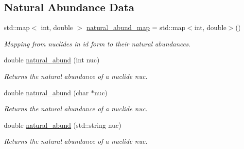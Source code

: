 \subsection*{Natural Abundance Data}
\begin{DoxyCompactItemize}
\item 
\mbox{\label{namespacepyne_aa4d7a8d3ef120d4d1abcfdf3f45b8964}} 
std\+::map$<$ int, double $>$ \hyperlink{namespacepyne_aa4d7a8d3ef120d4d1abcfdf3f45b8964}{natural\+\_\+abund\+\_\+map} = std\+::map$<$int, double$>$()
\begin{DoxyCompactList}\small\item\em Mapping from nuclides in id form to their natural abundances. \end{DoxyCompactList}\item 
double \hyperlink{namespacepyne_aa34a8311add97b0e90ce7600aa86f000}{natural\+\_\+abund} (int nuc)
\begin{DoxyCompactList}\small\item\em Returns the natural abundance of a nuclide {\itshape nuc}. \end{DoxyCompactList}\item 
\mbox{\label{namespacepyne_a54a674f1208696becf15da2c9941c496}} 
double \hyperlink{namespacepyne_a54a674f1208696becf15da2c9941c496}{natural\+\_\+abund} (char $\ast$nuc)
\begin{DoxyCompactList}\small\item\em Returns the natural abundance of a nuclide {\itshape nuc}. \end{DoxyCompactList}\item 
\mbox{\label{namespacepyne_a9f1c241172136f7b983c001c3b158ac4}} 
double \hyperlink{namespacepyne_a9f1c241172136f7b983c001c3b158ac4}{natural\+\_\+abund} (std\+::string nuc)
\begin{DoxyCompactList}\small\item\em Returns the natural abundance of a nuclide {\itshape nuc}. \end{DoxyCompactList}\end{DoxyCompactItemize}
